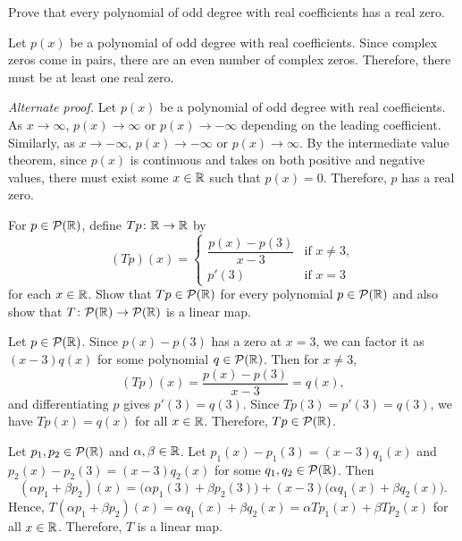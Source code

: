 \begin{exercise}
Prove that every polynomial of odd degree with real coefficients has a real
zero.
\end{exercise}
\begin{solution}
Let $p(x)$ be a polynomial of odd degree with real coefficients. Since complex
zeros come in pairs, there are an even number of complex zeros. Therefore,
there must be at least one real zero.

\emph{Alternate proof.} Let $p(x)$ be a polynomial of odd degree with real
coefficients. As $x\to\infty$, $p(x)\to\infty$ or $p(x)\to-\infty$ depending
on the leading coefficient. Similarly, as $x\to-\infty$, $p(x)\to-\infty$ or
$p(x)\to\infty$. By the intermediate value theorem, since $p(x)$ is continuous
and takes on both positive and negative values, there must exist some
$x\in\mathbb{R}$ such that $p(x)=0$. Therefore, $p$ has a real zero.
\end{solution}

\begin{exercise}
For $p\in\mathcal{P}(\mathbb{R})$, define $Tp\colon\mathbb{R}\to\mathbb{R}$ by
\[ (Tp)(x) = \begin{cases}
  \dfrac{p(x)-p(3)}{x-3} & \text{if } x\ne3,\\[2ex]
  p'(3) & \text{if } x=3
\end{cases} \]
for each $x\in\mathbb{R}$. Show that $Tp\in\mathcal{P}(\mathbb{R})$ for every polynomial
$p\in\mathcal{P}(\mathbb{R})$ and also show that $T\colon\mathcal{P}(\mathbb{R})\to\mathcal{P}(\mathbb{R})$ is a linear
map.
\end{exercise}
\begin{solution}
Let $p\in\mathcal{P}(\mathbb{R})$. Since $p(x)-p(3)$ has a zero at $x=3$, we can factor it
as $(x-3)q(x)$ for some polynomial $q\in\mathcal{P}(\mathbb{R})$. Then for $x\ne3$,
\[ (Tp)(x)=\frac{p(x)-p(3)}{x-3}=q(x), \]
and differentiating $p$ gives $p'(3)=q(3)$. Since $Tp(3)=p'(3)=q(3)$, we have
$Tp(x)=q(x)$ for all $x\in\mathbb{R}$. Therefore, $Tp\in\mathcal{P}(\mathbb{R})$.

Let $p_1,p_2\in\mathcal{P}(\mathbb{R})$ and $\alpha,\beta\in\mathbb{R}$. Let
$p_1(x)-p_1(3)=(x-3)q_1(x)$ and $p_2(x)-p_2(3)=(x-3)q_2(x)$ for some
$q_1,q_2\in\mathcal{P}(\mathbb{R})$. Then
\[ (\alpha p_1+\beta p_2)(x)=\bigl(\alpha p_1(3)+\beta p_2(3)\bigr)
   +(x-3)\bigl(\alpha q_1(x)+\beta q_2(x)\bigr). \]
Hence, $T(\alpha p_1+\beta p_2)(x)=\alpha q_1(x)+\beta q_2(x)
=\alpha Tp_1(x)+\beta Tp_2(x)$ for all $x\in\mathbb{R}$. Therefore, $T$ is a linear
map.
\end{solution}

